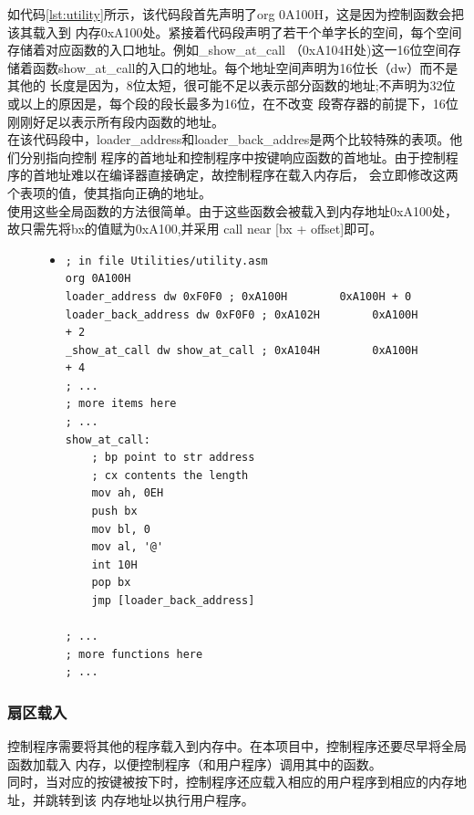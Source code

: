 \documentclass[a4paper]{article}
\newcommand{\codev}[1]{\textsf{#1}}
\begin{document}
    如代码\ref{lst:utility}所示，该代码段首先声明了\codev{org 0A100H}，这是因为控制函数会把该其载入到
    内存0xA100处。紧接着代码段声明了若干个单字长的空间，每个空间存储着对应函数的入口地址。例如\codev{\_show\_at\_call}
    （0xA104H处)这一16位空间存储着函数\codev{show\_at\_call}的入口的地址。每个地址空间声明为16位长（dw）而不是其他的
    长度是因为，8位太短，很可能不足以表示部分函数的地址;不声明为32位或以上的原因是，每个段的段长最多为16位，在不改变
    段寄存器的前提下，16位刚刚好足以表示所有段内函数的地址。\\
    
    在该代码段中，\codev{loader\_address}和\codev{loader\_back\_addres}是两个比较特殊的表项。他们分别指向控制
    程序的首地址和控制程序中按键响应函数的首地址。由于控制程序的首地址难以在编译器直接确定，故控制程序在载入内存后，
    会立即修改这两个表项的值，使其指向正确的地址。\\
    
    使用这些全局函数的方法很简单。由于这些函数会被载入到内存地址0xA100处，故只需先将bx的值赋为0xA100,并采用
    \codev{call near [bx + offset]}即可。
    \begin{figure}
    \begin{itemize}
    \item[] \begin{lstlisting}[language={[x86masm]Assembler}, label=lst:utility, caption=全局函数和其地址表的定义]
; in file Utilities/utility.asm
org 0A100H
loader_address dw 0xF0F0 ; 0xA100H        0xA100H + 0
loader_back_address dw 0xF0F0 ; 0xA102H        0xA100H + 2
_show_at_call dw show_at_call ; 0xA104H        0xA100H + 4
; ... 
; more items here
; ...
show_at_call:
    ; bp point to str address
    ; cx contents the length
    mov ah, 0EH
    push bx
    mov bl, 0
    mov al, '@'
    int 10H
    pop bx
    jmp [loader_back_address]

; ...
; more functions here
; ...
    \end{lstlisting}
    \end{itemize}
    \end{figure}

    \subsubsection{扇区载入}
    控制程序需要将其他的程序载入到内存中。在本项目中，控制程序还要尽早将全局函数加载入
    内存，以便控制程序（和用户程序）调用其中的函数。\\
    
    同时，当对应的按键被按下时，控制程序还应载入相应的用户程序到相应的内存地址，并跳转到该
    内存地址以执行用户程序。\\
    
\end{document}
